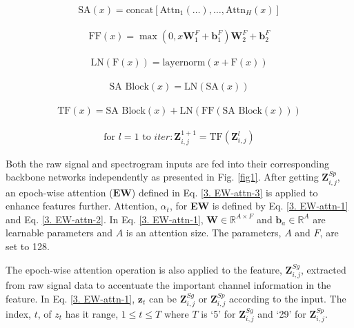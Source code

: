 \begin{align}
\label{2. attn-2}
\text{SA}(x) = \text{concat}[\text{Attn}_1(\ldots), \ldots, \text{Attn}_H(x)]
\end{align}
\vspace{-29pt}

\begin{align}
\label{2. attn-3}
\text{FF}(x) = \max(0, x \mathbf{W}^F_1 + \mathbf{b}^F_1) \mathbf{W}^F_2 + \mathbf{b}^F_2 
\end{align}
\vspace{-29pt}
 
\begin{align}
\label{2. attn-4}
\text{LN}(\text{F}(x)) = \text{layernorm}(x + \text{F}(x))
\end{align}
\vspace{-29pt}

\begin{align}
\label{2. attn-5}
\text{SA Block}(x) = \text{LN}(\text{SA}(x))
\end{align}
\vspace{-29pt}

\begin{align}
\label{2. attn-6}
\text{TF}(x) = \text{SA Block}(x) + \text{LN}(\text{FF}(\text{SA Block}(x)))
\end{align}
\vspace{-29pt}

\begin{align}
\label{2. attn-7}
\text{for } l = 1 \text{ to } iter: \mathbf{Z}^{1+1}_{i,j} = \text{TF}(\mathbf{Z}^{l}_{i,j}) 
\end{align}
\vspace{-10pt}


Both the raw signal and spectrogram inputs are fed into their corresponding backbone networks independently as presented in Fig. \ref{fig1}. After getting $\textbf{Z}^{Sp}_{i, j}$, an epoch-wise attention ($\textbf{EW}$) defined in Eq. \ref{3. EW-attn-3} is applied to enhance features further.  
%
Attention, $\alpha_t$, for {\bf EW} is defined by Eq. \ref{3. EW-attn-1} and Eq. \ref{3. EW-attn-2}.
%
In Eq. \ref{3. EW-attn-1}, $\mathbf{W} \in \mathbb{R}^{A \times F}$ and $\mathbf{b}_a \in \mathbb{R}^{A}$ are learnable parameters and $A$ is an attention size. The parameters, $A$ and $F$, are set to 128.

The epoch-wise attention operation is also applied to the feature, $\textbf{Z}^{Sg}_{i, j}$, extracted from raw signal data to accentuate the important channel information in the feature.
%
In Eq. \ref{3. EW-attn-1}, $\mathbf{z}_t$ can be $\textbf{Z}^{Sg}_{i, j}$ or $\textbf{Z}^{Sp}_{i,j}$ according to the input. The index, $t$, of $z_t$ has it range, $1 \le t \le T$ where $T$ is `5' for $\textbf{Z}^{Sg}_{i, j}$ and `29' for $\textbf{Z}^{Sp}_{i, j}$. 


